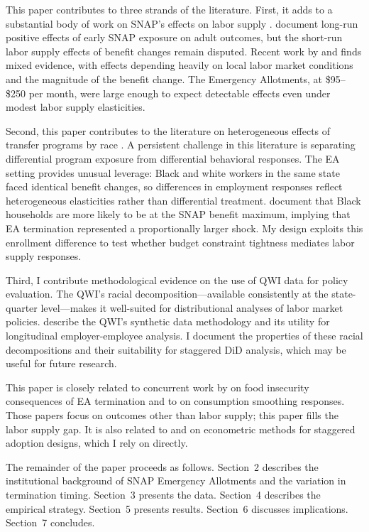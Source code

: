 \documentclass[12pt]{article}
\begin{document}
This paper contributes to three strands of the literature. First, it adds to a substantial body of work on SNAP's effects on labor supply \citep{hoynes2016snap}. \citet{hoynes2016snap} document long-run positive effects of early SNAP exposure on adult outcomes, but the short-run labor supply effects of benefit changes remain disputed. Recent work by  and  finds mixed evidence, with effects depending heavily on local labor market conditions and the magnitude of the benefit change. The Emergency Allotments, at \$95--\$250 per month, were large enough to expect detectable effects even under modest labor supply elasticities.

Second, this paper contributes to the literature on heterogeneous effects of transfer programs by race . A persistent challenge in this literature is separating differential program exposure from differential behavioral responses. The EA setting provides unusual leverage: Black and white workers in the same state faced identical benefit changes, so differences in employment responses reflect heterogeneous elasticities rather than differential treatment.  document that Black households are more likely to be at the SNAP benefit maximum, implying that EA termination represented a proportionally larger shock. My design exploits this enrollment difference to test whether budget constraint tightness mediates labor supply responses.

Third, I contribute methodological evidence on the use of QWI data for policy evaluation. The QWI's racial decomposition---available consistently at the state-quarter level---makes it well-suited for distributional analyses of labor market policies.  describe the QWI's synthetic data methodology and its utility for longitudinal employer-employee analysis. I document the properties of these racial decompositions and their suitability for staggered DiD analysis, which may be useful for future research.

This paper is closely related to concurrent work by  on food insecurity consequences of EA termination and to  on consumption smoothing responses. Those papers focus on outcomes other than labor supply; this paper fills the labor supply gap. It is also related to \citet{goodmanbacon2021difference} and \citet{sun2021estimating} on econometric methods for staggered adoption designs, which I rely on directly.

The remainder of the paper proceeds as follows. Section~2 describes the institutional background of SNAP Emergency Allotments and the variation in termination timing. Section~3 presents the data. Section~4 describes the empirical strategy. Section~5 presents results. Section~6 discusses implications. Section~7 concludes.
\end{document}
